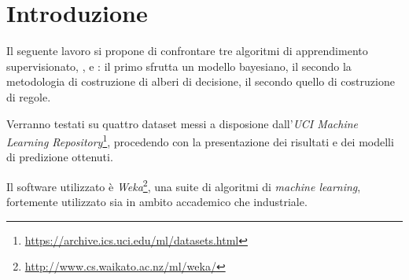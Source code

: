 \chapter{Introduzione}

Il seguente lavoro si propone di confrontare tre algoritmi di apprendimento supervisionato, \emph{}, \emph{} e \emph{}: il primo sfrutta un modello bayesiano, il secondo la metodologia di costruzione di alberi di decisione, il secondo quello di costruzione di regole.

Verranno testati su quattro dataset messi a disposione dall'\emph{UCI Machine Learning Repository}\footnote{\url{https://archive.ics.uci.edu/ml/datasets.html}}, procedendo con la presentazione dei risultati e dei modelli di predizione ottenuti.

Il software utilizzato è \emph{Weka}\footnote{\url{http://www.cs.waikato.ac.nz/ml/weka/}}, una suite di algoritmi di \textit{machine learning}, fortemente utilizzato sia in ambito accademico che industriale.